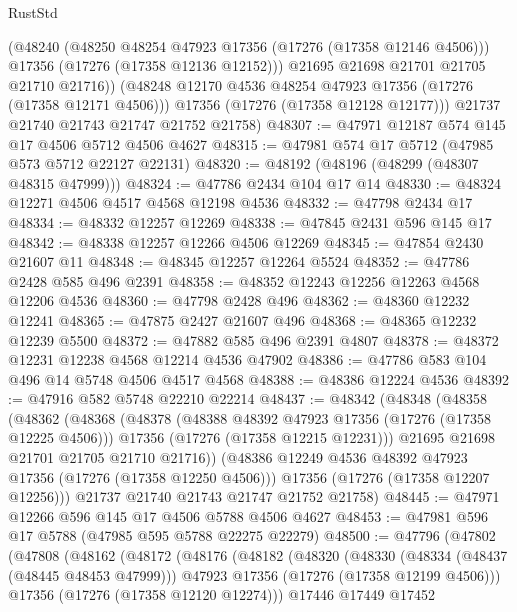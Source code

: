 \begin{lexlean}{RustStd}
\begin{coremodule}
            (@48240
              (@48250 @48254 @47923 @17356 (@17276 (@17358 @12146 @4506)))
              @17356
              (@17276 (@17358 @12136 @12152)))
            @21695
            @21698
            @21701
            @21705
            @21710
            @21716))
        (@48248 @12170 @4536 @48254 @47923 @17356 (@17276 (@17358 @12171 @4506)))
        @17356
        (@17276 (@17358 @12128 @12177)))
      @21737
      @21740
      @21743
      @21747
      @21752
      @21758)
@48307 := @47971 @12187 @574 @145 @17 @4506 @5712 @4506 @4627
@48315 := @47981 @574 @17 @5712 (@47985 @573 @5712 @22127 @22131)
@48320 := @48192 (@48196 (@48299 (@48307 @48315 @47999)))
@48324 := @47786 @2434 @104 @17 @14
@48330 := @48324 @12271 @4506 @4517 @4568 @12198 @4536
@48332 := @47798 @2434 @17
@48334 := @48332 @12257 @12269
@48338 := @47845 @2431 @596 @145 @17
@48342 := @48338 @12257 @12266 @4506 @12269
@48345 := @47854 @2430 @21607 @11
@48348 := @48345 @12257 @12264 @5524
@48352 := @47786 @2428 @585 @496 @2391
@48358 := @48352 @12243 @12256 @12263 @4568 @12206 @4536
@48360 := @47798 @2428 @496
@48362 := @48360 @12232 @12241
@48365 := @47875 @2427 @21607 @496
@48368 := @48365 @12232 @12239 @5500
@48372 := @47882 @585 @496 @2391 @4807
@48378 := @48372 @12231 @12238 @4568 @12214 @4536 @47902
@48386 := @47786 @583 @104 @496 @14 @5748 @4506 @4517 @4568
@48388 := @48386 @12224 @4536
@48392 := @47916 @582 @5748 @22210 @22214
@48437 := @48342
    (@48348
      (@48358
        (@48362
          (@48368
            (@48378
              (@48388 @48392 @47923 @17356 (@17276 (@17358 @12225 @4506)))
              @17356
              (@17276 (@17358 @12215 @12231)))
            @21695
            @21698
            @21701
            @21705
            @21710
            @21716))
        (@48386 @12249 @4536 @48392 @47923 @17356 (@17276 (@17358 @12250 @4506)))
        @17356
        (@17276 (@17358 @12207 @12256)))
      @21737
      @21740
      @21743
      @21747
      @21752
      @21758)
@48445 := @47971 @12266 @596 @145 @17 @4506 @5788 @4506 @4627
@48453 := @47981 @596 @17 @5788 (@47985 @595 @5788 @22275 @22279)
@48500 := @47796
    (@47802
      (@47808
        (@48162
          (@48172
            (@48176
              (@48182
                (@48320
                  (@48330
                    (@48334 (@48437 (@48445 @48453 @47999)))
                    @47923
                    @17356
                    (@17276 (@17358 @12199 @4506)))
                  @17356
                  (@17276 (@17358 @12120 @12274)))
                @17446
                @17449
                @17452

\end{coremodule}
\end{lexlean}
